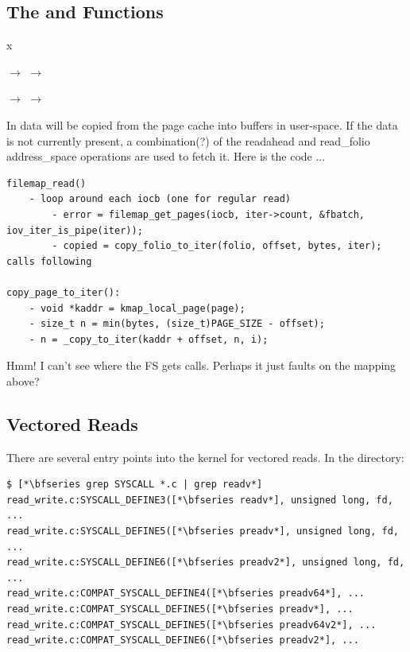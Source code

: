 
\subsection{The  and  Functions}

x

\small
\bigskip 
{} $\rightarrow$   $\rightarrow$ 

\vspace{1pt}
\hspace{1.37in}$\rightarrow$  $\rightarrow$ 
    
\bigskip
\normalsize
\noindent


In  data will be copied from the page cache into buffers in user-space.  If the data is not currently present, a combination(?) of the readahead and read\_folio address\_space operations are used to fetch it. Here is the code ...

\begin{lstlisting}
filemap_read()
    - loop around each iocb (one for regular read)
        - error = filemap_get_pages(iocb, iter->count, &fbatch, iov_iter_is_pipe(iter));
        - copied = copy_folio_to_iter(folio, offset, bytes, iter); calls following

copy_page_to_iter():
    - void *kaddr = kmap_local_page(page);
    - size_t n = min(bytes, (size_t)PAGE_SIZE - offset);
    - n = _copy_to_iter(kaddr + offset, n, i);
\end{lstlisting}

\noindent
Hmm! I can't see where the FS gets calls. Perhaps it just faults on the mapping above?


\subsection{Vectored Reads}

There are several entry points into the kernel for vectored reads. In the  directory:

\begin{lstlisting}
$ [*\bfseries grep SYSCALL *.c | grep readv*]
read_write.c:SYSCALL_DEFINE3([*\bfseries readv*], unsigned long, fd, ...
read_write.c:SYSCALL_DEFINE5([*\bfseries preadv*], unsigned long, fd, ...
read_write.c:SYSCALL_DEFINE6([*\bfseries preadv2*], unsigned long, fd, ...
read_write.c:COMPAT_SYSCALL_DEFINE4([*\bfseries preadv64*], ...
read_write.c:COMPAT_SYSCALL_DEFINE5([*\bfseries preadv*], ...
read_write.c:COMPAT_SYSCALL_DEFINE5([*\bfseries preadv64v2*], ...
read_write.c:COMPAT_SYSCALL_DEFINE6([*\bfseries preadv2*], ...
\end{lstlisting}

